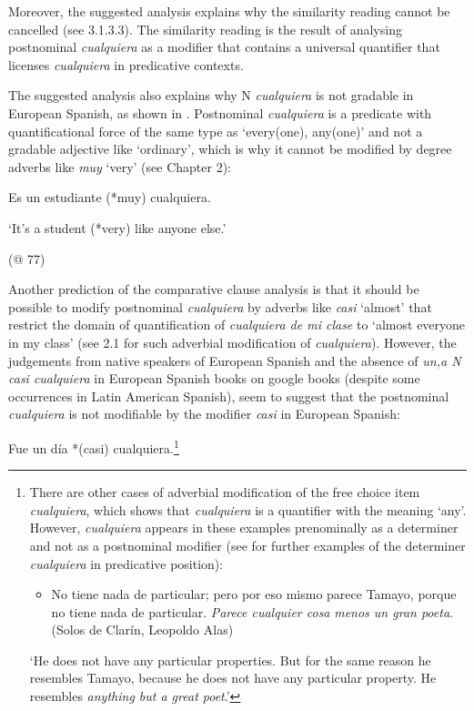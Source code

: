 \documentclass[output=paper]{langscibook}
\begin{document}
  Moreover, the suggested analysis explains why the similarity reading cannot be cancelled (see 3.1.3.3). The similarity reading is the result of analysing postnominal \textit{cualquiera} as a modifier that contains a universal quantifier that licenses \textit{cualquiera} in predicative contexts. 

  The suggested analysis also explains why N \textit{cualquiera} is not gradable in European Spanish, as shown in . Postnominal \textit{cualquiera} is a predicate with quantificational force of the same type as ‘every(one), any(one)’ and not a gradable adjective like ‘ordinary’, which is why it cannot be modified by degree adverbs like \textit{muy} ‘very’ (see Chapter 2):

\label{bkm:Ref58074686}  Es un estudiante (*muy) cualquiera.   

  ‘It’s a student (*very) like anyone else.’

  (@ 77)

Another prediction of the comparative clause analysis is that it should be possible to modify postnominal \textit{cualquiera} by adverbs like \textit{casi} ‘almost’ that restrict the domain of quantification of \textit{cualquiera de mi clase} to ‘almost everyone in my class’ (see 2.1 for such adverbial modification of \textit{cualquiera}). However, the judgements from native speakers of European Spanish and the absence of \textit{un,a N casi cualquiera} in European Spanish books on google books (despite some occurrences in Latin American Spanish), seem to suggest that the postnominal \textit{cualquiera} is not modifiable by the modifier \textit{casi} in European Spanish:

  Fue un día *(casi) cualquiera.\footnote{ \textrm{There are other cases of adverbial modification of the free choice item} \textrm{\textit{cualquiera}}\textrm{, which shows that} \textrm{\textit{cualquiera}} \textrm{is a quantifier with the meaning ‘any’. However,} \textrm{\textit{cualquiera}} \textrm{appears in these examples prenominally as a determiner and not as a postnominal modifier (see  for further examples of the determiner} \textrm{\textit{cualquiera}} \textrm{in predicative position):}

\begin{itemize}
\item \begin{styleFootnote}
\textrm{No tiene nada de particular; pero por eso mismo parece Tamayo, porque no tiene nada de particular.} \textrm{\textit{Parece cualquier cosa}} \textrm{\textit{menos un gran poeta}}\textrm{. (Solos de Clarín, Leopoldo Alas)}
\end{styleFootnote}
\end{itemize}
\textrm{‘He does not have any particular properties. But for the same reason he resembles Tamayo, because he does not have any particular property. He resembles} \textrm{\textit{anything but a great poet}}\textrm{.’}}   
\end{document}

